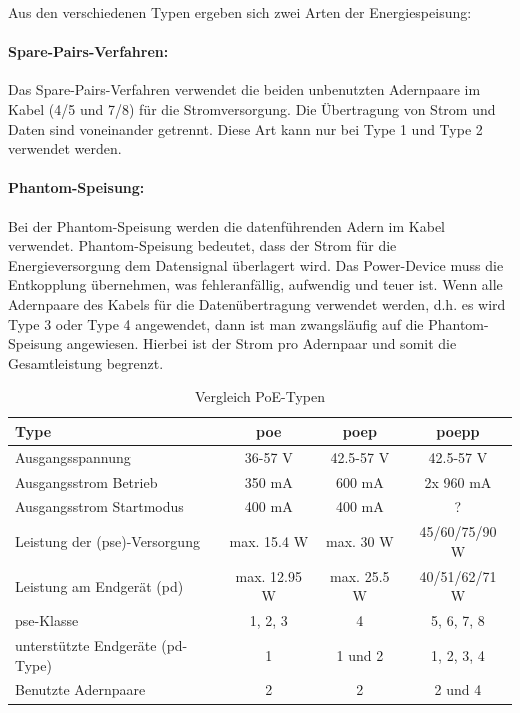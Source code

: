 Aus den verschiedenen Typen ergeben sich zwei Arten der Energiespeisung:
\paragraph{Spare-Pairs-Verfahren:}
Das Spare-Pairs-Verfahren verwendet die beiden unbenutzten Adernpaare im Kabel (4/5 und 7/8) für die Stromversorgung. Die Übertragung von Strom und Daten sind voneinander getrennt. Diese Art kann nur bei Type 1 und Type 2 verwendet werden.

\paragraph{Phantom-Speisung:}
Bei der Phantom-Speisung werden die datenführenden Adern im Kabel verwendet. Phantom-Speisung bedeutet, dass der Strom für die Energieversorgung dem Datensignal überlagert wird. Das Power-Device muss die Entkopplung übernehmen, was fehleranfällig, aufwendig und teuer ist.
Wenn alle Adernpaare des Kabels für die Datenübertragung verwendet werden, d.h. es wird Type 3 oder Type 4 angewendet, dann ist man zwangsläufig auf die Phantom-Speisung angewiesen. Hierbei ist der Strom pro Adernpaar und somit die Gesamtleistung begrenzt.

\begin{table}[H]
	\centering
	\begin{tabular}{lccc}
		\toprule
		Type & \ac{poe} & \ac{poep} & \ac{poepp} \\
		\midrule
		Ausgangsspannung & 36-57 V & 42.5-57 V & 42.5-57 V \\
		\midrule
		Ausgangsstrom Betrieb & 350 mA & 600 mA & 2x 960 mA \\
		\midrule
		Ausgangsstrom Startmodus & 400 mA & 400 mA & ? \\
		\midrule
		Leistung der (\ac{pse})-Versorgung & max. 15.4 W & max. 30 W & 45/60/75/90 W \\
		\midrule
		Leistung am Endgerät (\ac{pd}) & max. 12.95 W & max. 25.5 W & 40/51/62/71 W\\
		\midrule
		\ac{pse}-Klasse & 1, 2, 3 & 4 & 5, 6, 7, 8 \\
		\midrule
		unterstützte Endgeräte (\ac{pd}-Type) & 1 & 1 und 2 & 1, 2, 3, 4 \\
		\midrule
		Benutzte Adernpaare & 2 & 2 & 2 und 4 \\
		\bottomrule
	\end{tabular}
	\caption{Vergleich PoE-Typen \cite[vgl.][]{elektropraktiker-poe}}
	\label{tab:poe-types}
\end{table}

